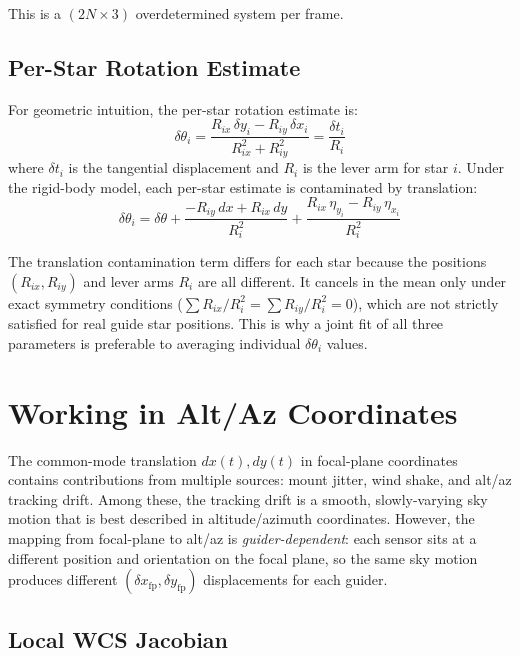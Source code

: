 \documentclass[SE,lsstdraft,authoryear,toc]{lsstdoc}
\newcommand{\Rix}{R_{ix}}
\newcommand{\Riy}{R_{iy}}
\begin{document}
\noindent
This is a $(2N \times 3)$ overdetermined system per frame.

\subsection{Per-Star Rotation Estimate}
\label{sec:perstar}

For geometric intuition, the per-star rotation estimate is:
\begin{equation}
\delta\theta_i
= \frac{\Rix\,\delta y_i - \Riy\,\delta x_i}{\Rix^2 + \Riy^2}
= \frac{\delta t_i}{R_i}
\label{eq:dtheta_i}
\end{equation}
where $\delta t_i$ is the tangential displacement and $R_i$ is the
lever arm for star $i$.  Under the rigid-body model, each per-star
estimate is contaminated by translation:
\begin{equation}
\delta\theta_i
= \delta\theta
+ \frac{-\Riy\,dx + \Rix\,dy}{R_i^2}
+ \frac{\Rix\,\eta_{y_i} - \Riy\,\eta_{x_i}}{R_i^2}
\label{eq:dtheta_i_contam}
\end{equation}

\noindent
The translation contamination term differs for each star because the
positions $(\Rix, \Riy)$ and lever arms $R_i$ are all different.  It
cancels in the mean only under exact symmetry conditions
($\sum \Rix/R_i^2 = \sum \Riy/R_i^2 = 0$), which are not strictly
satisfied for real guide star positions.  This is why a joint fit of
all three parameters is preferable to averaging individual
$\delta\theta_i$ values.

\section{Working in Alt/Az Coordinates}
\label{sec:altaz}

The common-mode translation $dx(t), dy(t)$ in focal-plane coordinates
contains contributions from multiple sources: mount jitter, wind
shake, and alt/az tracking drift.  Among these, the tracking drift is
a smooth, slowly-varying sky motion that is best described in
altitude/azimuth coordinates.  However, the mapping from focal-plane
to alt/az is \emph{guider-dependent}: each sensor sits at a different
position and orientation on the focal plane, so the same sky motion
produces different $(\delta x_\mathrm{fp}, \delta y_\mathrm{fp})$
displacements for each guider.

\subsection{Local WCS Jacobian}
\label{sec:fp_to_altaz}
\end{document}
